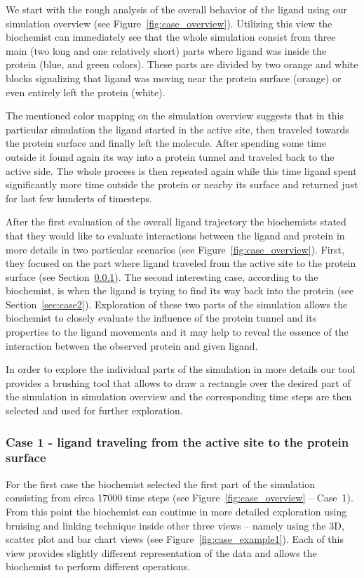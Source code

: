 \documentclass[twocolumn]{bmcart}%
\begin{document}
We start with the rough analysis of the overall behavior of the ligand using our simulation overview (see Figure~\ref{fig:case_overview}).
Utilizing this view the biochemist can immediately see that the whole simulation consist from three main (two long and one relatively short) parts where ligand was inside the protein (blue, and green colors).
These parts are divided by two orange and white blocks signalizing that ligand was moving near the protein surface (orange) or even entirely left the protein (white).
 
The mentioned color mapping on the simulation overview suggests that in this particular simulation the ligand started in the active site, then traveled towards the protein surface and finally left the molecule.
After spending some time outside it found again its way into a protein tunnel and traveled back to the active side.
The whole process is then repeated again while this time ligand spent significantly more time outside the protein or nearby its surface and returned just for last few hunderts of timesteps. 

After the first evaluation of the overall ligand trajectory the biochemists stated that they would like to evaluate interactions between the ligand and protein in more details in two particular scenarios (see Figure~\ref{fig:case_overview}). 
First, they focused on the part where ligand traveled from the active site to the protein surface (see Section~\ref{sec:case1}). 
The second interesting case, according to the biochemist, is when the ligand is trying to find its way back into the protein (see Section~\ref{sec:case2}).
Exploration of these two parts of the simulation allows the biochemist to closely evaluate the influence of the protein tunnel and its properties to the ligand movements and it may help to reveal the essence of the interaction between the observed protein and given ligand.

In order to explore the individual parts of the simulation in more details our tool provides a brushing tool that allows to draw a rectangle over the desired part of the simulation in simulation overview and the corresponding time steps are then selected and used for further exploration.

\subsubsection{Case 1 - ligand traveling from the active site to the protein surface}
\label{sec:case1}
For the first case the biochemist selected the first part of the simulation consisting from circa 17000 time steps (see Figure~\ref{fig:case_overview} -- Case~1). 
From this point the biochemist can continue in more detailed exploration using bruising and linking technique inside other three views -- namely using the 3D, scatter plot and bar chart views (see Figure~\ref{fig:case_example1}).
Each of this view provides slightly different representation of the data and allows the biochemist to perform different operations.
\end{document}
